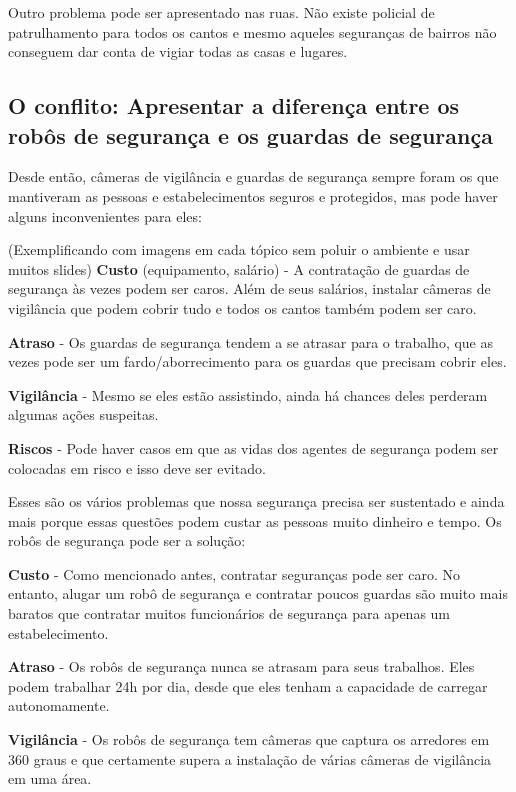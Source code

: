 \documentclass[12pt,a4paper]{article}
\begin{document}
    Outro problema pode ser apresentado nas ruas. Não existe policial de patrulhamento para todos os cantos e mesmo aqueles seguranças de bairros não conseguem dar conta de vigiar todas as casas e lugares. 

    \subsection{O conflito: Apresentar a diferença entre os robôs de segurança e os guardas de segurança}
    Desde então, câmeras de vigilância e guardas de segurança sempre foram os que mantiveram as pessoas e estabelecimentos seguros e protegidos, mas pode haver alguns inconvenientes para eles: 

    (Exemplificando com imagens em cada tópico sem poluir o ambiente e usar muitos slides)
    \textbf{Custo} (equipamento, salário) - A contratação de guardas de segurança às vezes podem ser caros. Além de seus salários, instalar câmeras de vigilância que podem cobrir tudo e todos os cantos também podem ser caro.

    \textbf{Atraso} - Os guardas de segurança tendem a se atrasar para o trabalho, que as vezes pode ser um fardo/aborrecimento para os guardas que precisam cobrir eles.

    \textbf{Vigilância} - Mesmo se eles estão assistindo, ainda há chances deles perderam algumas ações suspeitas.

    \textbf{Riscos} - Pode haver casos em que as vidas dos agentes de segurança podem ser colocadas em risco e isso deve ser evitado.

    Esses são os vários problemas que nossa segurança precisa ser sustentado e ainda mais porque essas questões podem custar as pessoas muito dinheiro e tempo. Os robôs de segurança pode ser a solução:

    \textbf{Custo} - Como mencionado antes, contratar seguranças pode ser caro. No entanto, alugar um robô de segurança e contratar poucos guardas são muito mais baratos que contratar muitos funcionários de segurança para apenas um estabelecimento.

    \textbf{Atraso} - Os robôs de segurança nunca se atrasam para seus trabalhos. Eles podem trabalhar 24h por dia, desde que eles tenham a capacidade de carregar autonomamente.

    \textbf{Vigilância} - Os robôs de segurança tem câmeras que captura os arredores em 360 graus e que certamente supera a instalação de várias câmeras de vigilância em uma área.
\end{document}
